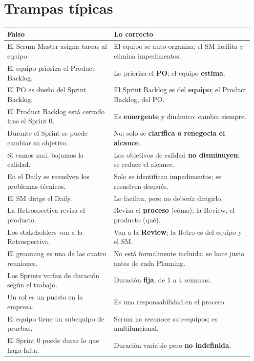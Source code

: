 \documentclass[11pt,a4paper,oneside,openany]{report}
\begin{document}
\section{Trampas típicas}
\begin{center}\small
\begin{tabular}{p{6.6cm}p{7.4cm}}
\toprule
\textbf{Falso} & \textbf{Lo correcto} \\ \midrule
El Scrum Master asigna tareas al equipo. & El equipo se auto-organiza; el SM facilita y elimina impedimentos. \\
El equipo prioriza el Product Backlog. & Lo prioriza el \textbf{PO}; el equipo \textbf{estima}. \\
El PO es dueño del Sprint Backlog. & El Sprint Backlog es del \textbf{equipo}; el Product Backlog, del PO. \\
El Product Backlog está cerrado tras el Sprint 0. & Es \textbf{emergente} y dinámico: cambia siempre. \\
Durante el Sprint se puede cambiar su objetivo. & No; solo se \textbf{clarifica o renegocia el alcance}. \\
Si vamos mal, bajamos la calidad. & Los objetivos de calidad \textbf{no disminuyen}; se reduce el alcance. \\
En el Daily se resuelven los problemas técnicos. & Solo se identifican impedimentos; se resuelven después. \\
El SM dirige el Daily. & Lo facilita, pero no debería dirigirlo. \\
La Retrospectiva revisa el producto. & Revisa el \textbf{proceso} (cómo); la Review, el producto (qué). \\
Los stakeholders van a la Retrospectiva. & Van a la \textbf{Review}; la Retro es del equipo y el SM. \\
El grooming es una de las cuatro reuniones. & No está formalmente incluida; se hace justo antes de cada Planning. \\
Los Sprints varían de duración según el trabajo. & Duración \textbf{fija}, de 1 a 4 semanas. \\
Un rol es un puesto en la empresa. & Es una responsabilidad en el proceso. \\
El equipo tiene un subequipo de pruebas. & Scrum no reconoce sub-equipos; es multifuncional. \\
El Sprint 0 puede durar lo que haga falta. & Duración variable pero \textbf{no indefinida}. \\
\bottomrule
\end{tabular}
\end{center}
\end{document}
